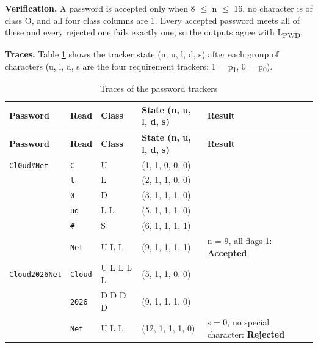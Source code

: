 \documentclass[12pt,a4paper]{article}
\begin{document}
\textbf{Verification.} A password is accepted only when 8 \ensuremath{\leq} n \ensuremath{\leq} 16, no character is of class O, and all four class columns are 1. Every accepted password meets all of these and every rejected one fails exactly one, so the outputs agree with L\textsubscript{PWD}.

\textbf{Traces.} Table \ref{tab:pw_trace} shows the tracker state (n, u, l, d, s) after each group of characters (u, l, d, s are the four requirement trackers: 1 = p\textsubscript{1}, 0 = p\textsubscript{0}).

{\footnotesize
\begin{longtable}{|>{\raggedright\arraybackslash}p{}|>{\raggedright\arraybackslash}p{}|>{\centering\arraybackslash}p{}|>{\centering\arraybackslash}p{}|>{\raggedright\arraybackslash}p{}|}
\caption[Traces of the password trackers]{Traces of the password trackers}\label{tab:pw_trace}\\
\hline
\rowcolor{hdr}\textbf{Password} & \textbf{Read} & \textbf{Class} & \textbf{State (n, u, l, d, s)} & \textbf{Result}\\ \hline
\endfirsthead
\hline
\rowcolor{hdr}\textbf{Password} & \textbf{Read} & \textbf{Class} & \textbf{State (n, u, l, d, s)} & \textbf{Result}\\ \hline
\endhead
\texttt{Cl0ud\#Net} & \texttt{C} & U & (1, 1, 0, 0, 0) & \\ \hline
 & \texttt{l} & L & (2, 1, 1, 0, 0) & \\ \hline
 & \texttt{0} & D & (3, 1, 1, 1, 0) & \\ \hline
 & \texttt{ud} & L L & (5, 1, 1, 1, 0) & \\ \hline
 & \texttt{\#} & S & (6, 1, 1, 1, 1) & \\ \hline
 & \texttt{Net} & U L L & (9, 1, 1, 1, 1) & n = 9, all flags 1: \textbf{Accepted}\\ \hline
\texttt{Cloud2026Net} & \texttt{Cloud} & U L L L L & (5, 1, 1, 0, 0) & \\ \hline
 & \texttt{2026} & D D D D & (9, 1, 1, 1, 0) & \\ \hline
 & \texttt{Net} & U L L & (12, 1, 1, 1, 0) & s = 0, no special character: \textbf{Rejected}\\ \hline
\end{longtable}}
\end{document}
